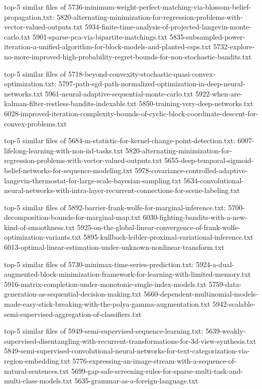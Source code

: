 \documentclass[11pt]{article}
\begin{document}
top-5 similar files of
5736-minimum-weight-perfect-matching-via-blossom-belief-propagation.txt:
5820-alternating-minimization-for-regression-problems-with-vector-valued-outputs.txt
5934-finite-time-analysis-of-projected-langevin-monte-carlo.txt
5901-sparse-pca-via-bipartite-matchings.txt
5835-subsampled-power-iteration-a-unified-algorithm-for-block-models-and-planted-csps.txt
5732-explore-no-more-improved-high-probability-regret-bounds-for-non-stochastic-bandits.txt

top-5 similar files of
5718-beyond-convexity-stochastic-quasi-convex-optimization.txt:
5797-path-sgd-path-normalized-optimization-in-deep-neural-networks.txt
5961-neural-adaptive-sequential-monte-carlo.txt
5922-when-are-kalman-filter-restless-bandits-indexable.txt
5850-training-very-deep-networks.txt
6028-improved-iteration-complexity-bounds-of-cyclic-block-coordinate-descent-for-convex-problems.txt

top-5 similar files of
5684-m-statistic-for-kernel-change-point-detection.txt:
6007-lifelong-learning-with-non-iid-tasks.txt
5820-alternating-minimization-for-regression-problems-with-vector-valued-outputs.txt
5655-deep-temporal-sigmoid-belief-networks-for-sequence-modeling.txt
5978-covariance-controlled-adaptive-langevin-thermostat-for-large-scale-bayesian-sampling.txt
5634-convolutional-neural-networks-with-intra-layer-recurrent-connections-for-scene-labeling.txt

top-5 similar files of
5892-barrier-frank-wolfe-for-marginal-inference.txt:
5700-decomposition-bounds-for-marginal-map.txt
6030-fighting-bandits-with-a-new-kind-of-smoothness.txt
5925-on-the-global-linear-convergence-of-frank-wolfe-optimization-variants.txt
5895-kullback-leibler-proximal-variational-inference.txt
6013-optimal-linear-estimation-under-unknown-nonlinear-transform.txt

top-5 similar files of 5730-minimax-time-series-prediction.txt:
5924-a-dual-augmented-block-minimization-framework-for-learning-with-limited-memory.txt
5916-matrix-completion-under-monotonic-single-index-models.txt
5759-data-generation-as-sequential-decision-making.txt
5660-dependent-multinomial-models-made-easy-stick-breaking-with-the-polya-gamma-augmentation.txt
5942-scalable-semi-supervised-aggregation-of-classifiers.txt

top-5 similar files of 5949-semi-supervised-sequence-learning.txt:
5639-weakly-supervised-disentangling-with-recurrent-transformations-for-3d-view-synthesis.txt
5849-semi-supervised-convolutional-neural-networks-for-text-categorization-via-region-embedding.txt
5776-expressing-an-image-stream-with-a-sequence-of-natural-sentences.txt
5699-gap-safe-screening-rules-for-sparse-multi-task-and-multi-class-models.txt
5635-grammar-as-a-foreign-language.txt
\end{document}
